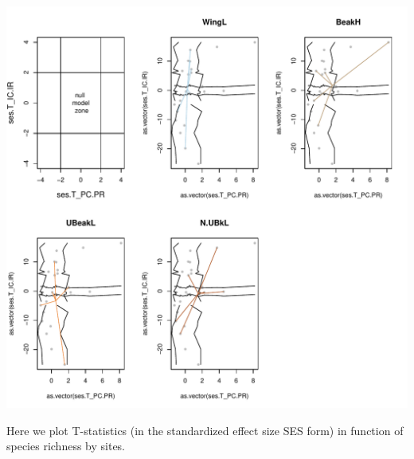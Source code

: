 \documentclass[12pt]{article}\usepackage[]{graphicx}\usepackage[]{color}
\makeatletter
\def\maxwidth{ %
  \ifdim\Gin@nat@width>\linewidth
    \linewidth
  \else
    \Gin@nat@width
  \fi
}
\newenvironment{knitrout}{}{} %
\makeatother
\begin{document}
\begin{knitrout}
\includegraphics[width=\maxwidth]{figure/unnamed-chunk-393} 

\end{knitrout}

Here we plot T-statistics (in the standardized effect size SES form) in function of species richness by sites.
\end{document}
